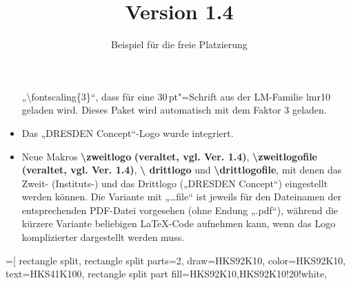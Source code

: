 \documentclass[serifmath,a0paper,noDIN,Mathematik]{tudmathposter}
\begin{document}
\begin{multicols}
\begin{itemize}
  „\textbackslash fontscaling\{3\}“, dass für eine $30$\,pt"=Schrift
  aus der LM-Familie lmr10 geladen wird. Dieses Paket wird automatisch
  mit dem Faktor 3 geladen.
\item Das „DRESDEN Concept“-Logo wurde integriert.
\item Neue Makros \textbf{\textbackslash zweitlogo} \textbf{(veraltet,
    vgl. Ver. 1.4)},
  \textbf{\textbackslash zweitlogofile} \textbf{(veraltet,
    vgl. Ver. 1.4)}, \textbf{\textbackslash
    drittlogo} und \textbf{\textbackslash drittlogofile}, mit denen
  das Zweit- (Instituts-) und das Drittlogo („DRESDEN Concept“)
  eingestellt werden können. Die Variante mit „\dots file“ ist jeweils
  für den Dateinamen der entsprechenden PDF-Datei vorgesehen (ohne
  Endung „.pdf“), während die kürzere Variante beliebigen LaTeX-Code
  aufnehmen kann, wenn das Logo komplizierter dargestellt werden muss.
\end{itemize}
\end{multicols}
\pagebreak\leavevmode
\title{Version 1.4}
\subtitle{Beispiel für die freie Platzierung}
\setlength{\columnsep}{1.5cm}%
\setlength{}%
\newcommand\hilfsgitter{%
  \draw[color=HKS92K10!50!white](0,0) grid [step=1mm] (\breite,\hoehe);
  \draw[color=HKS92K10](0,0) grid[step = 1cm] (\breite,\hoehe);
  \draw[color=HKS92K20](0,0) grid[step = 5cm] (\breite,\hoehe);
  \draw[color=HKS92K40](0,0) grid[step = 10cm] (\breite,\hoehe);
  \foreach \y in {0,5,...,90}
  \draw[color=HKS92K10] (0,\y) node [anchor=north west,inner sep = 2pt] {\tiny\y};
  \foreach \x in {0,5,...,70} \draw (\x,0) node [anchor=north
  west, inner sep = 2pt,color=HKS92K10] {\tiny\x};
}%
%
\makeatletter
\newcommand\nopt[1]{\strip@pt#1}%
\makeatother
%
\extrasngerman
%
\newlength{\breite}\setlength{\breite}{\textwidth}%
\newlength{\hoehe}\setlength{\hoehe}{\textheight}%
\newlength{\test}%
\newlength{\boxabstand}\setlength{\boxabstand}{0.25em}%
\newlength{\boxradius}\setlength{\boxradius}{2\boxabstand}%
\newlength{\randspaltenbreite}\setlength\randspaltenbreite{21.5cm-0.5\columnsep-\boxabstand}%
\newlength{\zweispaltenbreite}\setlength\zweispaltenbreite{\breite-\randspaltenbreite-2\columnsep-1\boxabstand}%
\newlength{\dreispaltenbreite}\setlength{\dreispaltenbreite}{\breite-2\boxabstand}%
\newlength{\mittelspaltenbreite}\setlength\mittelspaltenbreite{\breite-4\boxabstand-30cm-\columnsep}%
%
=[%
rectangle split,
rectangle split parts=2,
draw=HKS92K10,
color=HKS92K10,
text=HKS41K100,
rectangle split part fill={HKS92K10,HKS92K10!20!white},
\end{document}
